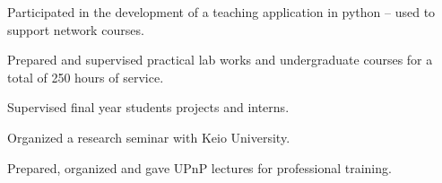 \begin{cvhonors}
  \cventryshort
    {}
    {\begin{cvitems}
        \item {Participated in the development of a teaching application in python -- used to support network courses.}
        \item {Prepared and supervised practical lab works and undergraduate courses for a total of 250 hours of service.}
        \item {Supervised final year students projects and interns.}
        \item {Organized a research seminar with Keio University.}
        \item {Prepared, organized and gave UPnP lectures for professional training.}
      \end{cvitems}
      }
\end{cvhonors}
